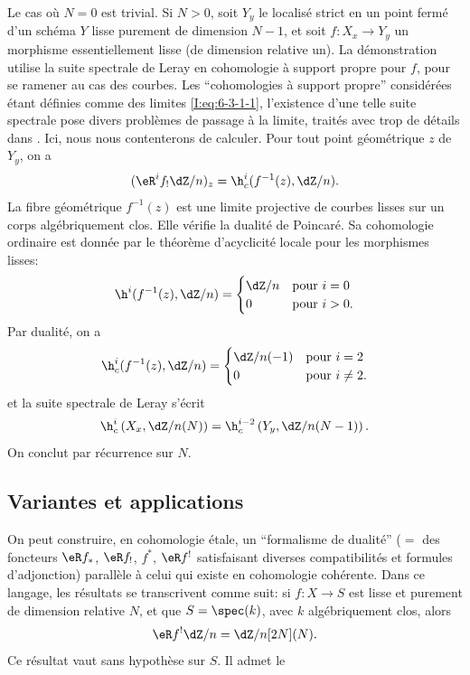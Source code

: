 Le cas où $N=0$ est trivial. Si $N>0$, soit $Y_y$ le localisé strict en un 
point fermé d'un schéma $Y$ lisse purement de dimension $N-1$, et soit 
$f:X_x\to Y_y$ un morphisme essentiellement lisse (de dimension relative un). 
La démonstration utilise la suite spectrale de Leray en cohomologie à 
support propre pour $f$, pour se ramener au cas des courbes. Les ``cohomologies 
à support propre'' considérées étant définies comme des limites 
\eqref{I:eq:6-3-1-1}, l'existence d'une telle suite spectrale pose divers 
problèmes de passage à la limite, traités avec trop de détails dans 
. Ici, nous nous contenterons de calculer. Pour tout point géométrique $z$ de $Y_y$, on a 
\[
  (\eR^if_! \dZ/n)_z = \h_c^i(f^{-1}(z),\dZ/n) \text{.}
\]
La fibre géométrique $f^{-1}(z)$ est une limite projective de courbes lisses 
sur un corps algébriquement clos. Elle vérifie la dualité de Poincaré. 
Sa cohomologie ordinaire est donnée par le théorème d'acyclicité locale 
pour les morphismes lisses: 
\[
  \h^i(f^{-1}(z),\dZ/n) 
    = \begin{cases}
        \dZ/n & \text{pour $i=0$} \\
        0     & \text{pour $i>0$.}
      \end{cases}
\]
Par dualité, on a 
\[
  \h_c^i(f^{-1}(z),\dZ/n) 
    = \begin{cases}
        \dZ/n(-1) & \text{pour $i=2$} \\
        0         & \text{pour $i\ne 2$.}
      \end{cases}
\]
et la suite spectrale de Leray s'écrit 
\[
  \h_c^i\left(X_x,\dZ/n(N)\right) = \h_c^{i-2}\left(Y_y,\dZ/n(N-1)\right) \text{.}
\]
On conclut par récurrence sur $N$. 










\subsection{Variantes et applications}\label{I:6-4}

On peut construire, en cohomologie étale, un ``formalisme de dualité'' 
($=$ des foncteurs $\eR f_*$, $\eR f_!$, $f^*$, $\eR f^!$ satisfaisant diverses 
compatibilités et formules d'adjonction) parallèle à celui qui existe en 
cohomologie cohérente. Dans ce langage, les résultats  se transcrivent comme suit: si $f:X\to S$ est lisse et purement 
de dimension relative $N$, et que $S=\spec(k)$, avec $k$ algébriquement clos, 
alors 
\[
  \eR f^! \dZ/n = \dZ/n [2N](N) \text{.}
\]
Ce résultat vaut sans hypothèse sur $S$. Il admet le 






